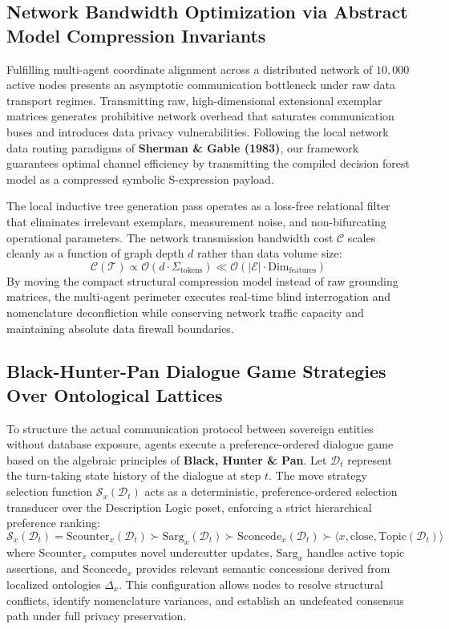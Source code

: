 \documentclass[11pt,fleqn]{article}
\begin{document}
\subsection{Network Bandwidth Optimization via Abstract Model Compression Invariants}
Fulfilling multi-agent coordinate alignment across a distributed network of $10,000$ active nodes presents an asymptotic communication bottleneck under raw data transport regimes. Transmitting raw, high-dimensional extensional exemplar matrices generates prohibitive network overhead that saturates communication buses and introduces data privacy vulnerabilities. Following the local network data routing paradigms of \textbf{Sherman \& Gable (1983)}, our framework guarantees optimal channel efficiency by transmitting the compiled decision forest model as a compressed symbolic S-expression payload. 

The local inductive tree generation pass operates as a loss-free relational filter that eliminates irrelevant exemplars, measurement noise, and non-bifurcating operational parameters. The network transmission bandwidth cost $\mathcal{C}$ scales cleanly as a function of graph depth $d$ rather than data volume size:
\begin{equation}
\mathcal{C}(\mathcal{T}) \propto \mathcal{O}(d \cdot \Sigma_{\text{tokens}}) \ll \mathcal{O}(|\mathcal{E}| \cdot \text{Dim}_{\text{features}})
\end{equation}
By moving the compact structural compression model instead of raw grounding matrices, the multi-agent perimeter executes real-time blind interrogation and nomenclature deconfliction while conserving network traffic capacity and maintaining absolute data firewall boundaries.

\subsection{Black-Hunter-Pan Dialogue Game Strategies Over Ontological Lattices}
To structure the actual communication protocol between sovereign entities without database exposure, agents execute a preference-ordered dialogue game based on the algebraic principles of \textbf{Black, Hunter \& Pan}. Let $\mathcal{D}_t$ represent the turn-taking state history of the dialogue at step $t$. The move strategy selection function $\mathcal{S}_x(\mathcal{D}_t)$ acts as a deterministic, preference-ordered selection transducer over the Description Logic poset, enforcing a strict hierarchical preference ranking:
\begin{equation}
\mathcal{S}_x(\mathcal{D}_t) = \text{Scounter}_x(\mathcal{D}_t) \succ \text{Sarg}_x(\mathcal{D}_t) \succ \text{Sconcede}_x(\mathcal{D}_t) \succ \langle x, \text{close}, \text{Topic}(\mathcal{D}_t) \rangle
\end{equation}
where $\text{Scounter}_x$ computes novel undercutter updates, $\text{Sarg}_x$ handles active topic assertions, and $\text{Sconcede}_x$ provides relevant semantic concessions derived from localized ontologies $\Delta_x$. This configuration allows nodes to resolve structural conflicts, identify nomenclature variances, and establish an undefeated consensus path under full privacy preservation.
\end{document}
